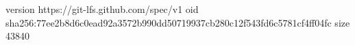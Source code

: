 version https://git-lfs.github.com/spec/v1
oid sha256:77ee2b8d6c0ead92a3572b990dd50719937cb280c12f543fd6c5781cf4ff04fc
size 43840
